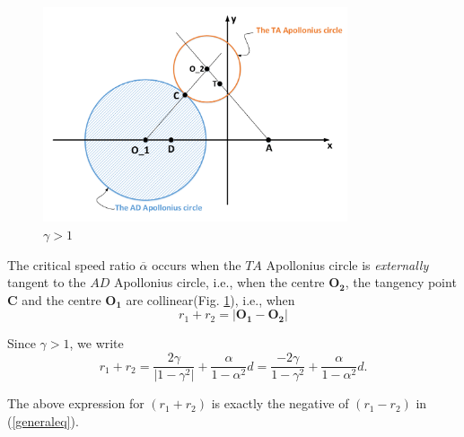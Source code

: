 \documentclass{beamer}
\begin{document}
\begin{frame}
\begin{figure}
\includegraphics[width=0.8\textwidth]{fig/drawing4_2b.pdf}
\caption {$\gamma>1$}
\label{4_g>1}
\end{figure}
\end{frame}
\begin{frame}
The critical speed ratio $\overline{\alpha}$ occurs when the $TA$ Apollonius circle is \textit{externally} tangent to the $AD$ Apollonius circle, i.e., when the centre $\boldsymbol{O_{2}}$, the tangency point $\boldsymbol{C}$ and the centre $\boldsymbol{O_{1}}$ are collinear(Fig. \ref{4_g>1}), i.e., when 
\begin{equation}
r_{1}+r_{2}=\lvert\boldsymbol{O_{1}}-\boldsymbol{O_{2}}\rvert
\label{case2}
\end{equation}      

Since $\gamma>1$, we write
\begin{equation}
r_{1}+r_{2}=\dfrac{2\gamma}{\lvert1-\gamma^{2}\rvert}+\dfrac{\alpha}{1-\alpha^{2}}d=\dfrac{-2 \gamma}{1-\gamma^{2}}+\dfrac{\alpha}{1-\alpha^{2}}d.
\end{equation}

The above expression for $(r_1+r_2)$ is exactly the negative of $(r_1-r_2)$ in (\ref{generaleq}).
\end{frame}
\end{document}
